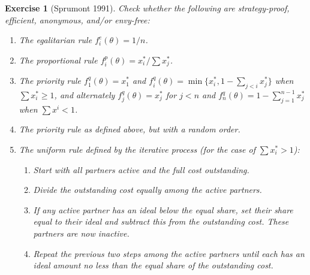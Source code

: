 \documentclass[letter, 10pt]{article}
\theoremstyle{basic}
\newtheorem{exercise}{Exercise}[section]
\begin{document}
\begin{spacing}{1.0}
\begin{exercise}[Sprumont 1991]
  \hspace{1em}
  Check whether the following are strategy-proof,
  efficient, anonymous, and/or envy-free:
  \begin{enumerate}
  \item The egalitarian rule $f_i^e(\theta) = 1/n$.
  \item The proportional rule $f_i^p(\theta) = x_i^*/\sum x_j^*$.
  \item The priority rule $f_1^q(\theta) = x_1^*$ and
    $f_i^q(\theta) = \min\{x_i^*, 1-\sum_{j<i} x_j^*\}$
    when $\sum x_i^* \geq 1$, and alternately $f_j^q(\theta) = x_j^*$
    for $j < n$ and $f_n^q(\theta) = 1 - \sum_{j=1}^{n-1}
    x_j^*$ when $\sum x^i < 1$.
  \item The priority rule as defined above, but with a random order.
  \item The uniform rule defined by the iterative process (for the case of
    $\sum x_i^* > 1$):
    \begin{enumerate}
    \item Start with all partners active and the full cost outstanding.
    \item Divide the outstanding cost equally among the active partners.
    \item If any active partner has an ideal below the equal
      share, set their share equal to their ideal and
      subtract this from the outstanding cost. These
      partners are now inactive.
    \item Repeat the previous two steps among the active
      partners until each has an ideal amount no less
      than the equal share of the outstanding cost.
    \end{enumerate}

  \end{enumerate}

\end{exercise}


\end{spacing}
\end{document}
